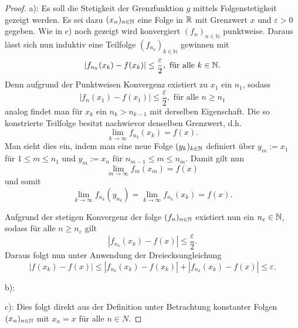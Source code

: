 \begin{proof}
  a): Es soll die Stetigkeit der Grenzfunktion $g$ mittels Folgenstetigkeit gezeigt werden. 
  Es sei dazu $(x_n)_{n \in \mathbb{N}}$ eine Folge in $\mathbb{R}$ mit Grenzwert $x$ und $\varepsilon > 0$ gegeben.
  Wie in c) noch gezeigt wird konvergiert $(f_n)_{n \in \mathbb{N}}$ punktweise.
  Daraus lässt sich nun induktiv eine Teilfolge $(f_{n_k})_{k \in \mathbb{N}}$ gewinnen mit
  \begin{displaymath}
    | f_{n_k}(x_k) - f(x_k) | \leq \frac{\varepsilon}{2}, \text{ für alle $k \in \mathbb{N}$}.
  \end{displaymath}
  Denn aufgrund der Punktweisen Konvergenz existiert zu $x_1$ ein $n_1$, sodass
  \begin{displaymath}
    | f_{n}(x_1) - f(x_1) | \leq \frac{\varepsilon}{2}, \text{ für alle $n \geq n_1$}
  \end{displaymath}
  analog findet man für $x_k$ ein $n_k > n_{k-1}$ mit derselben Eigenschaft.
  Die so konstrierte Teilfolge besitzt nachwievor denselben Grenzwert, d.h.
  \begin{displaymath}
    \lim_{k \to \infty} f_{n_k}(x_k) = f(x).
  \end{displaymath}
  Man sieht dies ein, indem man eine neue Folge $(y_k)_{k \in \mathbb{N}}$ definiert über $y_m:=x_1$ für $1 \leq m \leq n_1$ und $y_m:=x_n$ für $n_{m-1} \leq m \leq n_{m}$.
  Damit gilt nun
  \begin{displaymath}
    \lim_{m \to \infty} f_m(x_m) = f(x)
  \end{displaymath}
  und somit
  \begin{displaymath}
    \lim_{k \to \infty} f_{n_k}(y_{n_k}) 
    = \lim_{k \to \infty} f_{n_k}(x_{k}) = f(x).
  \end{displaymath}
  
  Aufgrund der stetigen Konvergenz der folge $(f_n)_{n \in \mathbb{N}}$ existiert nun ein $n_\varepsilon \in \mathbb{N}$, sodass für alle $n \geq n_\varepsilon$ gilt
  \begin{displaymath}
    | f_{n_k}(x_k) - f(x) | \leq \frac{\varepsilon}{2}.
  \end{displaymath}
  Daraus folgt nun unter Anwendung der Dreiecksungleichung
  \begin{displaymath}
    | f(x_k) - f(x) |
    \leq
    | f_{n_k}(x_k) - f(x_k) | + | f_{n_k}(x_k) - f(x) | 
    \leq \varepsilon.
  \end{displaymath}

  b):

  c): Dies folgt direkt aus der Definition unter Betrachtung konstanter Folgen $(x_n)_{n \in \mathbb{N}}$ mit $x_n = x$ für alle $n \in N$.
\end{proof}

